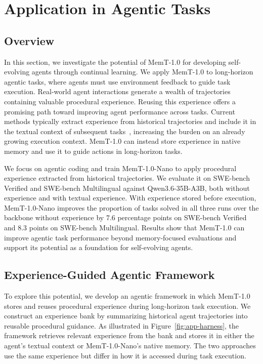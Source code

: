 \section{Application in Agentic Tasks}
\label{sec:applications}

\subsection{Overview}

In this section, we investigate the potential of MemT-1.0 for developing self-evolving agents through continual learning. We apply MemT-1.0 to long-horizon agentic tasks, where agents must use environment feedback to guide task execution. Real-world agent interactions generate a wealth of trajectories containing valuable procedural experience. Reusing this experience offers a promising path toward improving agent performance across tasks. Current methods typically extract experience from historical trajectories and include it in the textual context of subsequent tasks~\cite{zhao2024expel}, increasing the burden on an already growing execution context. MemT-1.0 can instead store experience in native memory and use it to guide actions in long-horizon tasks.

We focus on agentic coding and train MemT-1.0-Nano to apply procedural experience extracted from historical trajectories. We evaluate it on SWE-bench Verified and SWE-bench Multilingual against Qwen3.6-35B-A3B, both without experience and with textual experience. With experience stored before execution, MemT-1.0-Nano improves the proportion of tasks solved in all three runs over the backbone without experience by 7.6 percentage points on SWE-bench Verified and 8.3 points on SWE-bench Multilingual. Results show that MemT-1.0 can improve agentic task performance beyond memory-focused evaluations and support its potential as a foundation for self-evolving agents.

\subsection{Experience-Guided Agentic Framework}
\label{sec:app-method}

To explore this potential, we develop an agentic framework in which MemT-1.0 stores and reuses procedural experience during long-horizon task execution.
We construct an experience bank by summarizing historical agent trajectories into reusable procedural guidance. As illustrated in Figure~\ref{fig:app-harness}, the framework retrieves relevant experience from the bank and stores it in either the agent's textual context or MemT-1.0-Nano's native memory. The two approaches use the same experience but differ in how it is accessed during task execution.

